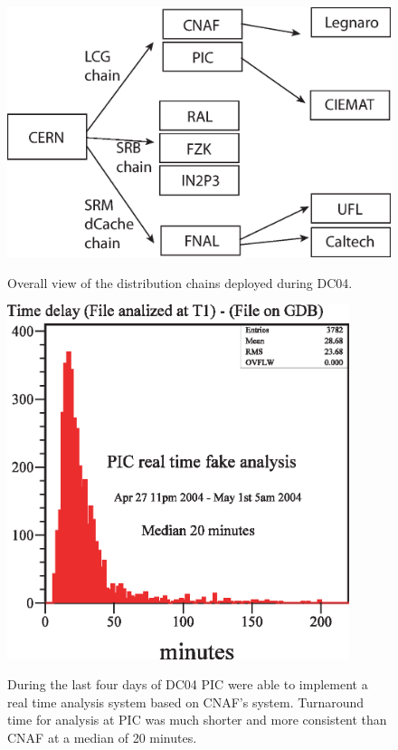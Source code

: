 \documentclass{cmspaper}
\begin{document}
\clearpage
\begin{figure}[tbp]
\centering
\includegraphics[width=15cm, angle = 90]{chains.eps}
\label{fig:chains}
\caption{Overall view of the distribution chains deployed during DC04.}
\end{figure}
\clearpage
\begin{figure}[tbp]
\centering
\includegraphics[width=10cm]{PIC-RTA.eps}
\label{fig:PIC-RTA}
\caption{During the last four days of DC04 PIC were able to implement
a real time analysis system based on CNAF's system. Turnaround time
for analysis at PIC was much shorter and more consistent than CNAF at
a median of 20 minutes. }
\end{figure}
\clearpage
\end{document}
